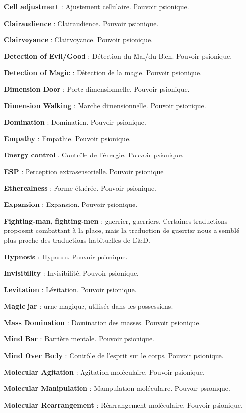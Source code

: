 \documentclass[11pt]{article}
\begin{document}
{{\textbf{Cell adjustment} : Ajustement cellulaire. Pouvoir psionique.

\textbf{Clairaudience} : Clairaudience. Pouvoir psionique.

\textbf{Clairvoyance} : Clairvoyance. Pouvoir psionique.

\textbf{Detection of Evil/Good} : Détection du Mal/du Bien. Pouvoir psionique.

\textbf{Detection of Magic} : Détection de la magie. Pouvoir psionique.

\textbf{Dimension Door} : Porte dimensionnelle. Pouvoir psionique.

\textbf{Dimension Walking} : Marche dimensionnelle. Pouvoir psionique.

\textbf{Domination} : Domination. Pouvoir psionique.

\textbf{Empathy} : Empathie. Pouvoir psionique.

\textbf{Energy control} : Contrôle de l'énergie. Pouvoir psionique.

\textbf{ESP} : Perception extrasensorielle. Pouvoir psionique.

\textbf{Etherealness} : Forme éthérée. Pouvoir psionique.

\textbf{Expansion} : Expansion. Pouvoir psionique.

\textbf{Fighting-man, fighting-men} : guerrier, guerriers. Certaines traductions proposent \og combattant \fg{} à la place, mais la traduction de guerrier nous a semblé plus proche des traductions habituelles de D\&D.

\textbf{Hypnosis} : Hypnose. Pouvoir psionique.

\textbf{Invisibility} : Invisibilité. Pouvoir psionique.

\textbf{Levitation} : Lévitation. Pouvoir psionique.

\textbf{Magic jar} : urne magique, utilisée dans les possessions.

\textbf{Mass Domination} : Domination des masses. Pouvoir psionique.

\textbf{Mind Bar} : Barrière mentale. Pouvoir psionique.

\textbf{Mind Over Body} : Contrôle de l'esprit sur le corps. Pouvoir psionique.

\textbf{Molecular Agitation} : Agitation moléculaire. Pouvoir psionique.

\textbf{Molecular Manipulation} : Manipulation moléculaire. Pouvoir psionique.

\textbf{Molecular Rearrangement} : Réarrangement moléculaire. Pouvoir psionique.

}}
\end{document}

